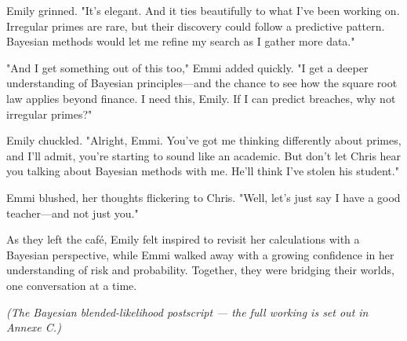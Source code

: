 Emily grinned. "It’s elegant. And it ties beautifully to what I’ve been working on. Irregular primes are rare, but their discovery could follow a predictive pattern. Bayesian methods would let me refine my search as I gather more data."

"And I get something out of this too," Emmi added quickly. "I get a deeper understanding of Bayesian principles—and the chance to see how the square root law applies beyond finance. I need this, Emily. If I can predict breaches, why not irregular primes?"

Emily chuckled. "Alright, Emmi. You’ve got me thinking differently about primes, and I’ll admit, you’re starting to sound like an academic. But don’t let Chris hear you talking about Bayesian methods with me. He’ll think I’ve stolen his student."

Emmi blushed, her thoughts flickering to Chris. "Well, let’s just say I have a good teacher—and not just you."

As they left the café, Emily felt inspired to revisit her calculations with a Bayesian perspective, while Emmi walked away with a growing confidence in her understanding of risk and probability. Together, they were bridging their worlds, one conversation at a time.

\textit{(The Bayesian blended-likelihood postscript --- the full working is set out in Annexe C.)}

